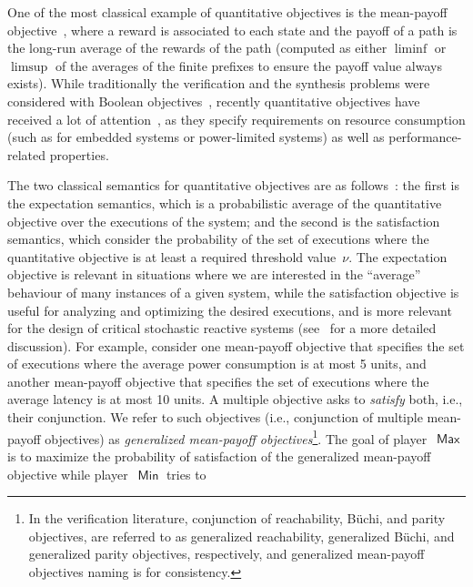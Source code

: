 \documentclass{article}
\DeclareMathOperator{\ma}{\mathsf{Max}}
\DeclareMathOperator{\mi}{\mathsf{Min}}
\begin{document}
\smallskip{}
One of the most classical example of quantitative objectives is the mean-payoff 
objective~\cite{FV97,Puterman,Gi57,EM79}, where a reward is associated to each
state and the payoff of a path is the long-run average of the rewards of the 
path (computed as either $\liminf$ or $\limsup$ of the averages of the finite 
prefixes to ensure the payoff value always exists).
While traditionally the verification and the synthesis problems were considered
with Boolean objectives~\cite{PnueliRosner,RamadgeWonham,KV05}, recently quantitative objectives have 
received a lot of attention~\cite{BCHJ09,CCHRS11,BBFR13}, as they specify requirements 
on resource consumption (such as for embedded systems or power-limited systems) as well 
as performance-related properties.

\smallskip{}
The two classical semantics for quantitative objectives are as follows~\cite{BBCFK14}:
the first is the expectation semantics, which is a probabilistic average of 
the quantitative objective over the executions of the system;
and the second is the satisfaction semantics, which consider the probability of
the set of executions where the quantitative objective is at least a required
threshold value~$\nu$.
The expectation objective is relevant in situations where we are interested 
in the ``average'' behaviour of many instances of a given system, while 
the satisfaction objective is useful for analyzing and optimizing the desired
executions, and is more relevant for the design of critical stochastic reactive 
systems (see~\cite{BBCFK14} for a more detailed discussion).
For example, consider one mean-payoff objective that specifies the set of 
executions where the average power consumption is at most 5 units, and 
another mean-payoff objective that specifies the set of executions where 
the average latency is at most 10 units. 
A multiple objective asks to \emph{satisfy} both, i.e., their conjunction. 
We refer to such objectives (i.e., conjunction of multiple mean-payoff 
objectives) as {\em generalized mean-payoff objectives}\footnote{In the verification
literature, conjunction of reachability, B\"uchi, and parity objectives, 
are referred to as generalized reachability, generalized B\"uchi, and generalized
parity objectives, respectively, and generalized mean-payoff objectives naming is 
for consistency.}. 
The goal of player~$\ma$ is to maximize the probability of satisfaction 
of the generalized mean-payoff objective while player~$\mi$ tries to 
\end{document}
